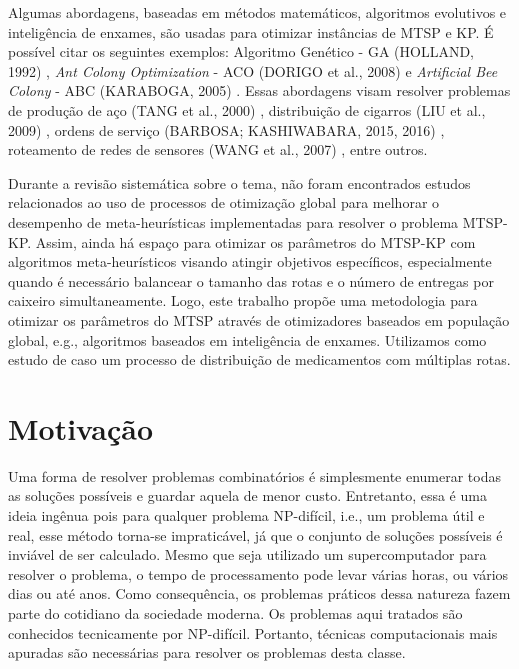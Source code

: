 Algumas abordagens, baseadas em métodos matemáticos, algoritmos evolutivos e inteligência de enxames, são usadas para otimizar instâncias de MTSP e KP. É possível citar os seguintes exemplos: Algoritmo Genético - GA (HOLLAND, 1992) \cite{holland1992genetic}, \textit{Ant Colony Optimization} - ACO (DORIGO et al., 2008) \cite{dorigo2008particle} e \textit{Artificial Bee Colony} - ABC (KARABOGA, 2005) \cite{karaboga2005idea}. Essas abordagens visam resolver problemas de produção de aço (TANG et al., 2000) \cite{tang2000multiple}, distribuição de cigarros (LIU et al., 2009) \cite{liu2009ant}, ordens de serviço (BARBOSA; KASHIWABARA, 2015, 2016) \cite{barbosa2015aplicaccao, barbosa2016aplicaccao}, roteamento de redes de sensores (WANG et al., 2007) \cite{wang2007hierarchical}, entre outros.

Durante a revisão sistemática sobre o tema, não foram encontrados estudos relacionados ao uso de processos de otimização global para melhorar o desempenho de meta-heurísticas implementadas para resolver o problema MTSP-KP. Assim, ainda há espaço para otimizar os parâmetros do MTSP-KP com algoritmos meta-heurísticos visando atingir objetivos específicos, especialmente quando é necessário balancear o tamanho das rotas e o número de entregas por caixeiro simultaneamente. Logo, este trabalho propõe uma metodologia para otimizar os parâmetros do MTSP através de otimizadores baseados em população global, e.g., algoritmos baseados em inteligência de enxames. Utilizamos como estudo de caso um processo de distribuição de medicamentos com múltiplas rotas.

\section{Motivação}
\label{sec-motivacao}

Uma forma de resolver problemas combinatórios é simplesmente enumerar todas as soluções possíveis e guardar aquela de menor custo. Entretanto, essa é uma ideia ingênua pois para qualquer problema NP-difícil, i.e., um problema útil e real, esse método torna-se impraticável, já que o conjunto de soluções possíveis é inviável de ser calculado. Mesmo que seja utilizado um supercomputador para resolver o problema, o tempo de processamento pode levar várias horas, ou vários dias ou até anos. Como consequência, os problemas práticos dessa natureza fazem parte do cotidiano da sociedade moderna. Os problemas aqui tratados são conhecidos tecnicamente por NP-difícil. Portanto, técnicas computacionais mais apuradas são necessárias para resolver os problemas desta classe.

